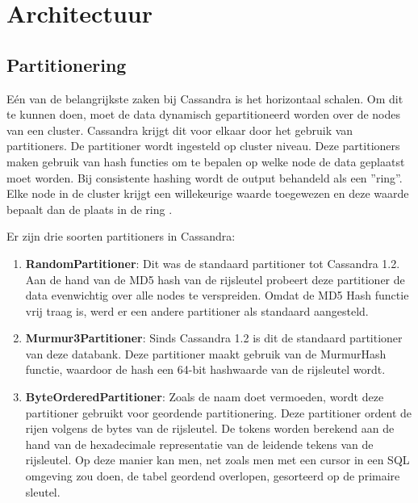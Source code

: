 \chapter{Architectuur}
\label{ch:cassandra_architectuur}

\section{Partitionering}
Eén van de belangrijkste zaken bij Cassandra is het horizontaal schalen.
Om dit te kunnen doen, moet de data dynamisch gepartitioneerd worden over de nodes van een cluster.
Cassandra krijgt dit voor elkaar door het gebruik van partitioners.
De partitioner wordt ingesteld op cluster niveau.
Deze partitioners maken gebruik van hash functies om te bepalen op welke node de data geplaatst moet worden.
Bij consistente hashing wordt de output behandeld als een ''ring''.
Elke node in de cluster krijgt een willekeurige waarde toegewezen en deze waarde bepaalt dan de plaats in de ring \citep{lakshman2010cassandra}.


Er zijn drie soorten partitioners in Cassandra:

\begin{enumerate}
	\item \textbf{RandomPartitioner}:
	Dit was de standaard partitioner tot Cassandra 1.2.
	Aan de hand van de MD5 hash van de rijsleutel probeert deze partitioner de data evenwichtig over alle nodes te verspreiden.
	Omdat de MD5 Hash functie vrij traag is, werd er een andere partitioner als standaard aangesteld.
	
	\item \textbf{Murmur3Partitioner}:
	Sinds Cassandra 1.2 is dit de standaard partitioner van deze databank.
	Deze partitioner maakt gebruik van de MurmurHash functie, waardoor de hash een 64-bit hashwaarde van de rijsleutel wordt.
	
	\item \textbf{ByteOrderedPartitioner}:
	Zoals de naam doet vermoeden, wordt deze partitioner gebruikt voor geordende partitionering.
	Deze partitioner ordent de rijen volgens de bytes van de rijsleutel.
	De tokens worden berekend aan de hand van de hexadecimale representatie van de leidende tekens van de rijsleutel.
	Op deze manier kan men, net zoals men met een cursor in een SQL omgeving zou doen, de tabel geordend overlopen, gesorteerd op de primaire sleutel.
	
\end{enumerate}

